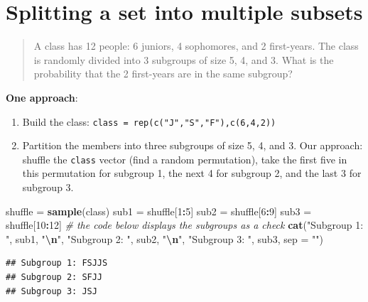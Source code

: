 \documentclass[
]{book}
\newenvironment{Shaded}{\begin{snugshade}}{\end{snugshade}}
\newcommand{\AttributeTok}[1]{\textcolor[rgb]{0.13,0.29,0.53}{#1}}
\newcommand{\CommentTok}[1]{\textcolor[rgb]{0.56,0.35,0.01}{\textit{#1}}}
\newcommand{\DecValTok}[1]{\textcolor[rgb]{0.00,0.00,0.81}{#1}}
\newcommand{\FunctionTok}[1]{\textcolor[rgb]{0.13,0.29,0.53}{\textbf{#1}}}
\newcommand{\NormalTok}[1]{#1}
\newcommand{\OtherTok}[1]{\textcolor[rgb]{0.56,0.35,0.01}{#1}}
\newcommand{\SpecialCharTok}[1]{\textcolor[rgb]{0.81,0.36,0.00}{\textbf{#1}}}
\newcommand{\StringTok}[1]{\textcolor[rgb]{0.31,0.60,0.02}{#1}}
\theoremstyle{definition}
\theoremstyle{definition}
\theoremstyle{definition}
\theoremstyle{definition}
\theoremstyle{remark}
\begin{document}
\section{Splitting a set into multiple subsets}\label{partition-set-R}

\begin{quote}
A class has 12 people: 6 juniors, 4 sophomores, and 2 first-years. The class is randomly divided into 3 subgroups of size 5, 4, and 3. What is the probability that the 2 first-years are in the same subgroup?
\end{quote}

\textbf{One approach}:

\begin{enumerate}
\def\labelenumi{\arabic{enumi}.}
\item
  Build the class: \texttt{class\ =\ rep(c("J","S","F"),c(6,4,2))}
\item
  Partition the members into three subgroups of size 5, 4, and 3. Our approach: shuffle the \texttt{class} vector (find a random permutation), take the first five in this permutation for subgroup 1, the next 4 for subgroup 2, and the last 3 for subgroup 3.
\end{enumerate}

\begin{Shaded}
\begin{Highlighting}[]
\NormalTok{shuffle }\OtherTok{=} \FunctionTok{sample}\NormalTok{(class)}
\NormalTok{sub1 }\OtherTok{=}\NormalTok{ shuffle[}\DecValTok{1}\SpecialCharTok{:}\DecValTok{5}\NormalTok{]}
\NormalTok{sub2 }\OtherTok{=}\NormalTok{ shuffle[}\DecValTok{6}\SpecialCharTok{:}\DecValTok{9}\NormalTok{]}
\NormalTok{sub3 }\OtherTok{=}\NormalTok{ shuffle[}\DecValTok{10}\SpecialCharTok{:}\DecValTok{12}\NormalTok{]}
\CommentTok{\# the code below displays the subgroups as a check}
\FunctionTok{cat}\NormalTok{(}\StringTok{"Subgroup 1: "}\NormalTok{, sub1, }\StringTok{"}\SpecialCharTok{\textbackslash{}n}\StringTok{"}\NormalTok{,}
    \StringTok{"Subgroup 2: "}\NormalTok{, sub2, }\StringTok{"}\SpecialCharTok{\textbackslash{}n}\StringTok{"}\NormalTok{,}
    \StringTok{"Subgroup 3: "}\NormalTok{, sub3, }\AttributeTok{sep =} \StringTok{""}\NormalTok{)}
\end{Highlighting}
\end{Shaded}

\begin{verbatim}
## Subgroup 1: FSJJS
## Subgroup 2: SFJJ
## Subgroup 3: JSJ
\end{verbatim}
\end{document}
